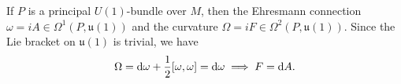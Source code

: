 \begin{example}
    If $P$ is a principal $U(1)$-bundle over $M$, then the Ehresmann connection $\omega=iA\in\Omega^1(P,\mathfrak{u}(1))$
    and the curvature $\Omega=iF\in\Omega^2(P, \mathfrak{u}(1))$.\footnotemark 
    Since the Lie bracket on $\mathfrak{u}(1)$ is trivial, we have 
    \begin{equation*}
        \Omega = {\rm d}\omega + \frac{1}{2}[\omega, \omega] = {\rm d}\omega \implies F = {\rm d} A.
    \end{equation*}
\end{example}